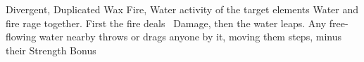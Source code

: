   {Divergent, Duplicated}%
  {Wax}%
  {Fire, Water}%
  {activity of the target elements}%
  {%
    Water and fire rage together.
    First the fire deals \showDam~Damage, then the water leaps.
    Any free-flowing water nearby throws or drags anyone by it, moving them  \glspl{step}, minus their Strength Bonus}%
  {}
